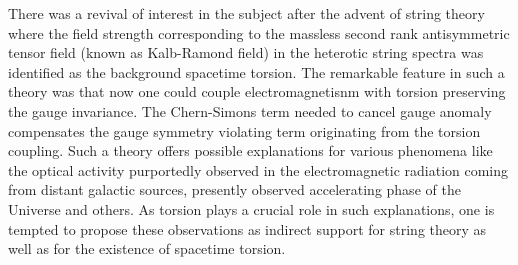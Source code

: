 \documentclass[a4paper,12pt]{article}
\begin{document}
There was a revival of interest in the subject after the advent of
string theory\cite{gsw} where the field strength corresponding to
the massless second rank antisymmetric tensor field (known as
Kalb-Ramond field) in the heterotic string spectra was identified
as the background spacetime torsion. The remarkable feature in
such a theory was that now one could couple electromagnetisnm with
torsion preserving the \coordHE{} gauge invariance\cite{pmssg}. The
Chern-Simons term needed to cancel gauge anomaly compensates the
gauge symmetry violating term originating from the torsion
coupling. Such a theory offers possible explanations for various
phenomena like the optical activity purportedly observed in the
electromagnetic radiation coming from distant galactic
sources,\cite{skpmssgasss} presently observed accelerating phase
of the Universe and others\cite{ssgss}. As torsion plays a crucial
role in such explanations, one is tempted to propose these
observations as indirect support for string theory as well as for
the existence of spacetime torsion.
\end{document}
